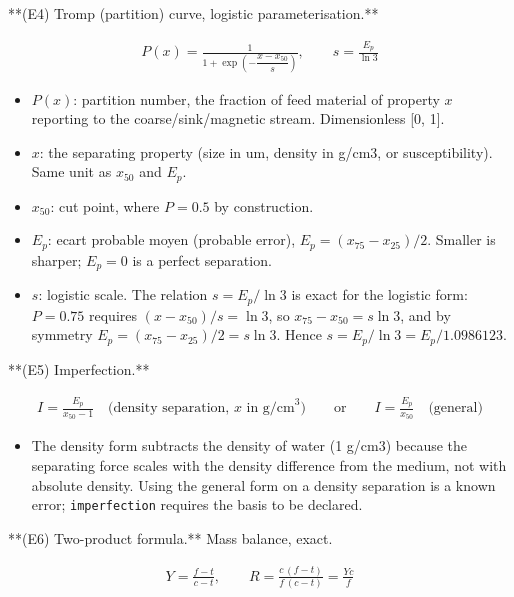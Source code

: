 \documentclass[10pt,a4paper,twoside]{report}
\begin{document}
**(E4) Tromp (partition) curve, logistic parameterisation.**

\begin{equation*}
\begin{gathered}
P(x) = \frac{1}{1 + \exp\!\left(-\dfrac{x - x_{50}}{s}\right)}, \qquad s = \frac{E_p}{\ln 3}
\end{gathered}
\end{equation*}

\begin{itemize}
\item $P(x)$: partition number, the fraction of feed material of property $x$ reporting to the coarse/sink/magnetic stream. Dimensionless [0, 1].
\item $x$: the separating property (size in um, density in g/cm3, or susceptibility). Same unit as $x_{50}$ and $E_p$.
\item $x_{50}$: cut point, where $P = 0.5$ by construction.
\item $E_p$: ecart probable moyen (probable error), $E_p = (x_{75} - x_{25})/2$. Smaller is sharper; $E_p = 0$ is a perfect separation.
\item $s$: logistic scale. The relation $s = E_p/\ln 3$ is exact for the logistic form: $P = 0.75$ requires $(x - x_{50})/s = \ln 3$, so $x_{75} - x_{50} = s \ln 3$, and by symmetry $E_p = (x_{75} - x_{25})/2 = s \ln 3$. Hence $s = E_p/\ln 3 = E_p/1.0986123$.
\end{itemize}

**(E5) Imperfection.**

\begin{equation*}
\begin{gathered}
I = \frac{E_p}{x_{50} - 1} \quad \text{(density separation, } x \text{ in g/cm}^3) \qquad\text{or}\qquad I = \frac{E_p}{x_{50}} \quad \text{(general)}
\end{gathered}
\end{equation*}

\begin{itemize}
\item The density form subtracts the density of water (1 g/cm3) because the separating force scales with the density difference from the medium, not with absolute density. Using the general form on a density separation is a known error; \texttt{imperfection} requires the basis to be declared.
\end{itemize}

**(E6) Two-product formula.** Mass balance, exact.

\begin{equation*}
\begin{gathered}
Y = \frac{f - t}{c - t}, \qquad R = \frac{c\,(f - t)}{f\,(c - t)} = \frac{Y c}{f}
\end{gathered}
\end{equation*}
\end{document}
